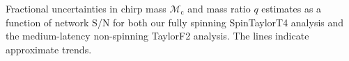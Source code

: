 \label{fig:Mc_q_std_snr} Fractional uncertainties in chirp mass $\mathcal{M}_\mathrm{c}$ and mass ratio $q$ estimates as a function of network S/N for both our fully spinning SpinTaylorT4 analysis and the medium-latency non-spinning TaylorF2 analysis. The lines indicate approximate trends.
  
  
  
  